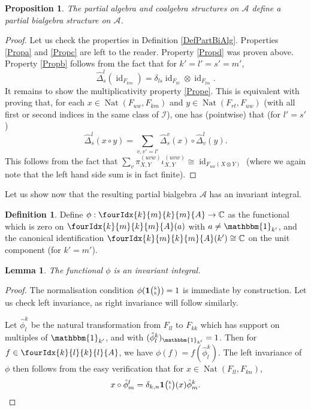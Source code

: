 \documentclass[10pt]{article}
\DeclareMathOperator{\id}{id}
\DeclareMathOperator{\Nat}{\mathrm{Nat}}
\newcommand{\C}{\mathbb{C}}
\newcommand{\Grt}[3]{#1{\tiny {\begin{pmatrix} #2\\#3\end{pmatrix}}}}
\newcommand{\Unitb}{\mathbbm{1}}
\newcommand{\UnitC}[2]{\Grt{\mathbf{1}}{#1}{#2}}
\newcommand{\Gr}[5]{\fourIdx{#2}{#4}{#3}{#5}{#1}}%
\newtheorem{Lem}[Theorem]{Lemma}
\newtheorem{Prop}[Theorem]{Proposition}
\theoremstyle{definition}
\newtheorem{Def}[Theorem]{Definition}
\numberwithin{equation}{section}
\begin{document}
\begin{Prop} The partial algebra and coalgebra structures on $\mathscr{A}$ define a partial bialgebra structure on $\mathscr{A}$. 
\end{Prop}
\begin{proof} Let us check the properties in Definition \ref{DefPartBiAlg}. Properties \ref{Propa} and \ref{Propc} are left to the reader. Property \ref{Propd} was proven above. Property \ref{Propb} follows from the fact that for $k'=l'=s'=m'$, \[\hat{\Delta}^{l}_s(\id_{F_{km}}) = \delta_{ls} \id_{F_{kl}}\otimes \id_{F_{lm}}.\] 
It remains to show the multiplicativity property \ref{Prope}. This is equivalent with proving that, for each $x\in \Nat(F_{uw},F_{km})$ and $y\in \Nat(F_{rt},F_{uw})$ (with all first or second indices in the same class of $\mathscr{I}$), one has (pointwise) that (for $l'=s'$) \[ \hat{\Delta}^l_s(x\circ y) = \sum_{v,v'=l'} \hat{\Delta}^v_s(x)\circ \hat{\Delta}^l_v(y).\] This follows from the fact that $\sum_v \pi^{(uvw)}_{X,Y}\iota^{(uvw)}_{X,Y} \cong \id_{F_{uw}(X\otimes Y)}$ (where we again note that the left hand side sum is in fact finite).
\end{proof} 

Let us show now that the resulting partial bialgebra $\mathscr{A}$ has an invariant integral.

\begin{Def} Define $\phi: \Gr{A}{k}{k}{m}{m} \rightarrow \C$ as the functional which is zero on $\Gr{A}{k}{k}{m}{m}(a)$ with $a\neq \Unitb_{k'}$, and the canonical identification $\Gr{A}{k}{k}{m}{m}(k')\cong \C$ on the unit component (for $k'=m'$).
\end{Def}

\begin{Lem} The functional $\phi$ is an invariant integral.
\end{Lem}

\begin{proof} The normalisation condition $\phi(\UnitC{k}{k})=1$ is immediate by construction. Let us check left invariance, as right invariance will follow similarly.

Let $\hat{\phi}^k_l$ be the natural transformation from $F_{ll}$ to $F_{kk}$ which has support on multiples of $\Unitb_{k'}$, and with $(\hat{\phi}^k_l)_{\Unitb_{k'}} = 1$.  Then for $f\in \Gr{A}{k}{k}{l}{l}$, we have $\phi(f) = f(\hat{\phi}^k_l)$. The left invariance of $\phi$ then follows from the easy verification that for $x\in \Nat(F_{ll},F_{kn})$, \[x\circ \hat{\phi}^l_m =\delta_{k,n} \UnitC{k}{l}(x)\hat{\phi}^k_m.\] 
\end{proof}
\end{document}
